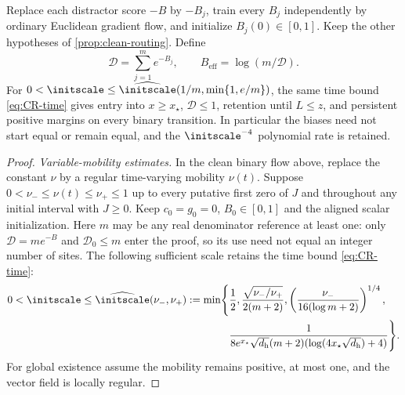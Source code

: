 \begin{corollary}
\label{cor:CR-independent}
Replace each distractor score $-B$ by $-B_j$, train every $B_j$ independently by ordinary Euclidean gradient flow,
and initialize $B_j(0)\in[0,1]$. Keep the other hypotheses of \cref{prop:clean-routing}.
Define
\[
 \mathcal D=\sum_{j=1}^m e^{-B_j},\qquad B_{\mathrm{eff}}=\log(m/\mathcal D).
\]
For $0<\initscale\le\widehat\initscale(1/m,\min\{1,e/m\})$, the same time bound \cref{eq:CR-time} gives
entry into $x\ge x_\star$, $\mathcal D\le1$, retention until $L\le z$, and persistent positive margins on every binary transition.
In particular the biases need not start equal or remain equal, and the $\initscale^{-4}$ polynomial rate is retained.
\end{corollary}
\begin{proof}
\emph{Variable-mobility estimates.}
In the clean binary flow above, replace the constant $\nu$ by a regular time-varying mobility $\nu(t)$.
Suppose $0<\nu_-\le\nu(t)\le\nu_+\le1$ up to every putative first zero of $J$ and throughout any initial interval with $J\ge0$.
Keep $c_0=g_0=0$, $B_0\in[0,1]$ and the aligned scalar initialization.
Here $m$ may be any real denominator reference at least one: only $\mathcal D=me^{-B}$ and $\mathcal D_0\le m$ enter the proof,
so its use need not equal an integer number of sites.
The following sufficient scale retains the time bound \cref{eq:CR-time}:
\begin{equation}
 \begin{aligned}
 0<\initscale\le\widehat\initscale(\nu_-,\nu_+):=\min\Biggl\{&\frac12,
 \frac{\sqrt{\nu_-/\nu_+}}{2(m+2)},
 \left(\frac{\nu_-}{16(\log m+2)}\right)^{1/4},\\
 &\frac1{8e^{x_\star}\sqrt{d_{\mathrm h}}(m+2)(\log(4x_\star\sqrt{d_{\mathrm h}})+4)}\Biggr\}.
 \end{aligned}
 \label{eq:CR-variable-scale}
\end{equation}
For global existence assume the mobility remains positive, at most one, and the vector field is locally regular.


\end{proof}
